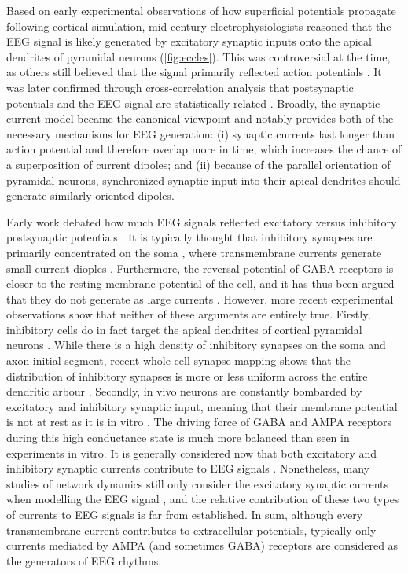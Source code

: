 Based on early experimental observations of how superficial potentials propagate following cortical simulation, mid-century electrophysiologists \cite{Eccles1951} reasoned that the EEG signal is likely generated by excitatory synaptic inputs onto the apical dendrites of pyramidal neurons (\autoref{fig:eccles}). This was controversial at the time, as others still believed that the signal primarily reflected action potentials \cite{Burns1950}. It was later confirmed through cross-correlation analysis that postsynaptic potentials and the EEG signal are statistically related \cite{KLEE1965}. Broadly, the synaptic current model became the canonical viewpoint and notably provides both of the necessary mechanisms for EEG generation: (i) synaptic currents last longer than action potential and therefore overlap more in time, which increases the chance of a superposition of current dipoles; and (ii) because of the parallel orientation of pyramidal neurons, synchronized synaptic input into their apical dendrites should generate similarly oriented dipoles.

Early work debated how much EEG signals reflected excitatory versus inhibitory postsynaptic potentials \cite{Pollen1964,Creutzfeldt1966, Creutzfeldt1966a}. It is typically thought that inhibitory synapses are primarily concentrated on the soma \cite{Telenczuk2020, Mazzoni2015,Næss2021}, where transmembrane currents generate small current dioples \cite{Ahlfors2015}. Furthermore, the reversal potential of GABA receptors is closer to the resting membrane potential of the cell, and it has thus been argued that they do not generate as large currents \cite{Buzsaki2012}. However, more recent experimental observations show that neither of these arguments are entirely true. Firstly, inhibitory cells do in fact target the apical dendrites of cortical pyramidal neurons \cite{Palmer2012}. While there is a high density of inhibitory synapses on the soma and axon initial segment, recent whole-cell synapse mapping shows that the distribution of inhibitory synapses is more or less uniform across the entire dendritic arbour \cite{Iacaruso2017}. Secondly, in vivo neurons are constantly bombarded by excitatory and inhibitory synaptic input, meaning that their membrane potential is not at rest as it is in vitro \cite{Destexhe2003}. The driving force of GABA and AMPA receptors during this high conductance state is much more balanced than seen in experiments in vitro. It is generally considered now that both excitatory and inhibitory synaptic currents contribute to EEG signals \cite{Buzsaki2012}. Nonetheless, many studies of network dynamics still only consider the excitatory synaptic currents when modelling the EEG signal \cite{Jensen2005,McCarthy2008}, and the relative contribution of these two types of currents to EEG signals is far from established. In sum, although every transmembrane current contributes to extracellular potentials, typically only currents mediated by AMPA (and sometimes GABA) receptors are considered as the generators of EEG rhythms.

